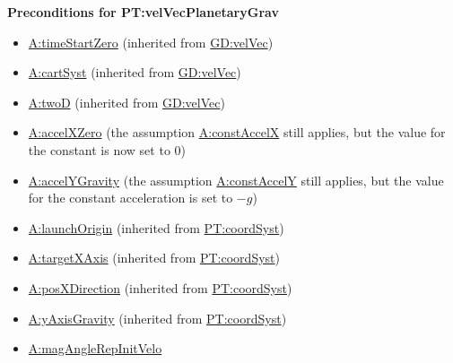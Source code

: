 \documentclass[12pt]{article}
\begin{document}
\noindent \textbf{Preconditions for PT:velVecPlanetaryGrav}
\begin{itemize}
\item \hyperref[timeStartZero]{A:timeStartZero} (inherited from \hyperref[GD:velVec]{GD:velVec})
\item \hyperref[cartSyst]{A:cartSyst} (inherited from \hyperref[GD:velVec]{GD:velVec})
\item \hyperref[twoD]{A:twoD} (inherited from \hyperref[GD:velVec]{GD:velVec})
\item \hyperref[accelXZero]{A:accelXZero} (the assumption \hyperref[constAccelX]{A:constAccelX} still applies, but the value for the constant is now set to 0)
\item \hyperref[accelYGravity]{A:accelYGravity} (the assumption \hyperref[constAccelY]{A:constAccelY} still applies, but the value for the constant acceleration is set to $-g$)
\item \hyperref[launchOrigin]{A:launchOrigin} (inherited from \hyperref[PT:coordSyst]{PT:coordSyst})
\item \hyperref[targetXAxis]{A:targetXAxis} (inherited from \hyperref[PT:coordSyst]{PT:coordSyst})
\item \hyperref[posXDirection]{A:posXDirection} (inherited from \hyperref[PT:coordSyst]{PT:coordSyst})
\item \hyperref[yAxisGravity]{A:yAxisGravity} (inherited from \hyperref[PT:coordSyst]{PT:coordSyst})
\item \hyperref[magAngleRepInitVelo]{A:magAngleRepInitVelo}
\end{itemize}
\end{document}
